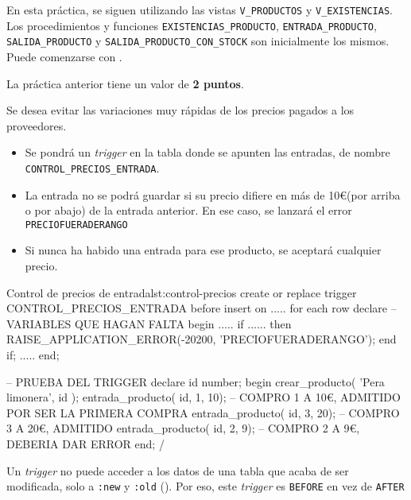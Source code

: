 En esta práctica, se siguen utilizando las vistas \texttt{V\_PRODUCTOS} y \texttt{V\_EXISTENCIAS}. Los procedimientos y funciones \texttt{EXISTENCIAS\_PRODUCTO}, \texttt{ENTRADA\_PRODUCTO}, \texttt{SALIDA\_PRODUCTO} y \texttt{SALIDA\_PRODUCTO\_CON\_STOCK} son inicialmente los mismos. Puede comenzarse con .

La práctica anterior tiene un valor de \textbf{2 puntos}.

\newpage

\begin{homeworkProblem}

  Se desea evitar las variaciones muy rápidas de los precios pagados a los proveedores.
  \begin{itemize}
  \item Se pondrá un \textit{trigger} en la tabla donde se apunten las entradas, de nombre \texttt{CONTROL\_PRECIOS\_ENTRADA}.
  \item La entrada  no se podrá guardar si su precio difiere en más de 10\euro (por arriba o por abajo) de la entrada anterior. En ese caso, se lanzará el error \texttt{PRECIOFUERADERANGO}
  \item Si nunca ha habido una entrada para ese producto, se aceptará cualquier precio.
  \end{itemize}

\begin{listadosql}{Control de precios de entrada}{lst:control-precios}
create or replace trigger CONTROL_PRECIOS_ENTRADA
before insert on .....
for each row 
declare
  -- VARIABLES QUE HAGAN FALTA
begin
  .....
  if ...... then
    RAISE_APPLICATION_ERROR(-20200, 'PRECIOFUERADERANGO');
  end if;
.....
end;

-- PRUEBA DEL TRIGGER
declare
  id number;
begin
  crear_producto( 'Pera limonera', id );
  entrada_producto( id, 1, 10); -- COMPRO 1 A 10€, ADMITIDO POR SER LA PRIMERA COMPRA
  entrada_producto( id, 3, 20); -- COMPRO 3 A 20€, ADMITIDO
  entrada_producto( id, 2, 9); -- COMPRO 2 A 9€, DEBERIA DAR ERROR
end;
/
\end{listadosql}  

  \begin{Aviso}
    Un \textit{trigger} no puede acceder a los datos de una tabla que acaba de ser modificada, solo a \texttt{:new} y \texttt{:old} (). Por eso, este \textit{trigger} es \texttt{BEFORE} en vez de \texttt{AFTER}
  \end{Aviso}


\end{homeworkProblem}

